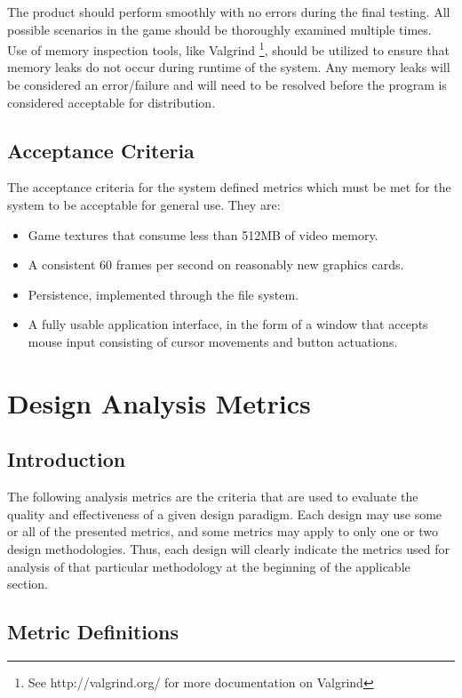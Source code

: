 \documentclass{article}
\begin{document}
    The product should perform smoothly with no errors during the final testing. All possible scenarios in the game should be thoroughly examined multiple times. Use of memory inspection tools, like Valgrind \footnote{See http://valgrind.org/ for more documentation on Valgrind}, should be utilized to ensure that memory leaks do not occur during runtime of the system. Any memory leaks will be considered an error/failure and will need to be resolved before the program is considered acceptable for distribution.
	\subsection{Acceptance Criteria}
		The acceptance criteria for the system defined metrics which must be met for the system to be acceptable for general use. They are:
		\begin{itemize}
			\item Game textures that consume less than 512MB of video memory.
      \item A consistent 60 frames per second on reasonably new graphics cards.
			\item Persistence, implemented through the file system. 
			\item A fully usable application interface, in the form of a window that accepts mouse input consisting of cursor movements and button actuations.
		\end{itemize}
%
%
\section{Design Analysis Metrics}
	\subsection{Introduction}
		The following analysis metrics are the criteria that are used to evaluate the quality and effectiveness of a given design paradigm. Each design may use some or all of the presented metrics, and some metrics may apply to only one or two design methodologies. Thus, each design will clearly indicate the metrics used for analysis of that particular methodology at the beginning of the applicable section. 
	\subsection{Metric Definitions}
\end{document}
